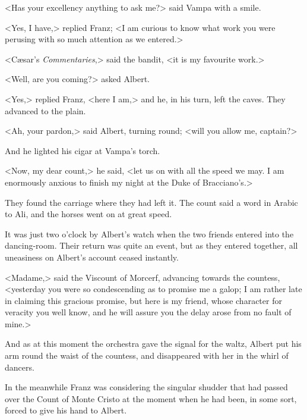  <Has your excellency anything to ask me?> said Vampa with a smile. 

 <Yes, I have,> replied Franz; <I am curious to know what work you were perusing with so much attention as we entered.> 

 <Cæsar's \textit{Commentaries},> said the bandit, <it is my favourite work.> 

 <Well, are you coming?> asked Albert. 

 <Yes,> replied Franz, <here I am,> and he, in his turn, left the caves. They advanced to the plain. 

 <Ah, your pardon,> said Albert, turning round; <will you allow me, captain?> 

 And he lighted his cigar at Vampa's torch. 

 <Now, my dear count,> he said, <let us on with all the speed we may. I am enormously anxious to finish my night at the Duke of Bracciano's.> 

 They found the carriage where they had left it. The count said a word in Arabic to Ali, and the horses went on at great speed. 

 It was just two o'clock by Albert's watch when the two friends entered into the dancing-room. Their return was quite an event, but as they entered together, all uneasiness on Albert's account ceased instantly. 

 <Madame,> said the Viscount of Morcerf, advancing towards the countess, <yesterday you were so condescending as to promise me a galop; I am rather late in claiming this gracious promise, but here is my friend, whose character for veracity you well know, and he will assure you the delay arose from no fault of mine.> 

 And as at this moment the orchestra gave the signal for the waltz, Albert put his arm round the waist of the countess, and disappeared with her in the whirl of dancers. 

 In the meanwhile Franz was considering the singular shudder that had passed over the Count of Monte Cristo at the moment when he had been, in some sort, forced to give his hand to Albert. 
